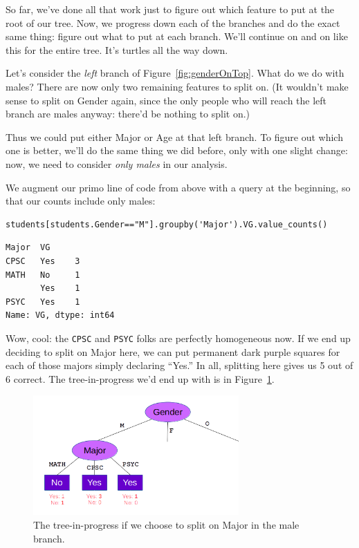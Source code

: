 
So far, we've done all that work just to figure out which feature to put at the
root of our tree. Now, we progress down each of the branches and do the exact
same thing: figure out what to put at each branch. We'll continue on and on
like this for the entire tree. It's turtles all the way down.


Let's consider the \textit{left} branch of Figure~\ref{fig:genderOnTop}. What
do we do with males? There are now only two remaining features to split on. (It
wouldn't make sense to split on \textsf{Gender} again, since the only people
who will reach the left branch are males anyway: there'd be nothing to split
on.)

Thus we could put either \textsf{Major} or \textsf{Age} at that left branch. To
figure out which one is better, we'll do the same thing we did before, only
with one slight change: now, we need to consider \textit{only males} in our
analysis.

We augment our primo line of code from above with a query at the beginning, so
that our counts include only males:

\begin{Verbatim}[fontsize=\small,samepage=true,frame=single,framesep=3mm]
students[students.Gender=="M"].groupby('Major').VG.value_counts()
\end{Verbatim}
\vspace{-.2in}

\begin{Verbatim}[fontsize=\small,samepage=true,frame=leftline,framesep=5mm,framerule=1mm]
Major  VG 
CPSC   Yes    3
MATH   No     1
       Yes    1
PSYC   Yes    1
Name: VG, dtype: int64
\end{Verbatim}

Wow, cool: the \texttt{CPSC} and \texttt{PSYC} folks are perfectly homogeneous
now. If we end up deciding to split on \textsf{Major} here, we can put
permanent dark purple squares for each of those majors simply declaring
``Yes.'' In all, splitting here gives us 5 out of 6 correct. The
tree-in-progress we'd end up with is in Figure~\ref{fig:maleMajorSplit}.

\begin{figure}[ht]
\centering
\includegraphics[width=0.7\textwidth]{maleMajorSplit.png}
\caption{The tree-in-progress if we choose to split on \textsf{Major} in the
male branch.}
\label{fig:maleMajorSplit}
\end{figure}

